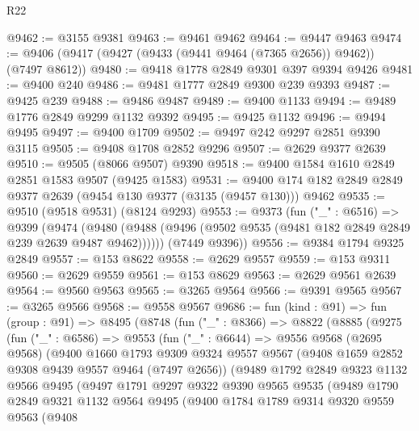 \begin{lexlean}{R22}
\begin{coremodule}
@9462 := @3155 @9381
@9463 := @9461 @9462
@9464 := @9447 @9463
@9474 := @9406 (@9417 (@9427 (@9433 (@9441 @9464 (@7365 @2656)) @9462)) (@7497 @8612))
@9480 := @9418 @1778 @2849 @9301 @397 @9394 @9426
@9481 := @9400 @240
@9486 := @9481 @1777 @2849 @9300 @239 @9393
@9487 := @9425 @239
@9488 := @9486 @9487
@9489 := @9400 @1133
@9494 := @9489 @1776 @2849 @9299 @1132 @9392
@9495 := @9425 @1132
@9496 := @9494 @9495
@9497 := @9400 @1709
@9502 := @9497 @242 @9297 @2851 @9390 @3115
@9505 := @9408 @1708 @2852 @9296
@9507 := @2629 @9377 @2639
@9510 := @9505 (@8066 @9507) @9390
@9518 := @9400 @1584 @1610 @2849 @2851 @1583 @9507 (@9425 @1583)
@9531 := @9400 @174 @182 @2849 @2849 @9377 @2639 (@9454 @130 @9377 (@3135 (@9457 @130))) @9462
@9535 := @9510 (@9518 @9531) (@8124 @9293)
@9553 := @9373
    (fun ("_" : @6516) =>
    @9399
      (@9474 (@9480 (@9488 (@9496 (@9502 @9535 (@9481 @182 @2849 @2849 @239 @2639 @9487 @9462))))))
      (@7449 @9396))
@9556 := @9384 @1794 @9325 @2849
@9557 := @153 @8622
@9558 := @2629 @9557
@9559 := @153 @9311
@9560 := @2629 @9559
@9561 := @153 @8629
@9563 := @2629 @9561 @2639
@9564 := @9560 @9563
@9565 := @3265 @9564
@9566 := @9391 @9565
@9567 := @3265 @9566
@9568 := @9558 @9567
@9686 := fun (kind : @91) =>
  fun (group : @91) =>
  @8495
    (@8748
      (fun ("_" : @8366) =>
      @8822
        (@8885
          (@9275
            (fun ("_" : @6586) =>
            @9553
              (fun ("_" : @6644) =>
              @9556
                @9568
                (@2695 @9568)
                (@9400
                  @1660
                  @1793
                  @9309
                  @9324
                  @9557
                  @9567
                  (@9408 @1659 @2852 @9308 @9439 @9557 @9464 (@7497 @2656))
                  (@9489
                    @1792
                    @2849
                    @9323
                    @1132
                    @9566
                    @9495
                    (@9497
                      @1791
                      @9297
                      @9322
                      @9390
                      @9565
                      @9535
                      (@9489
                        @1790
                        @2849
                        @9321
                        @1132
                        @9564
                        @9495
                        (@9400
                          @1784
                          @1789
                          @9314
                          @9320
                          @9559
                          @9563
                          (@9408

\end{coremodule}
\end{lexlean}
